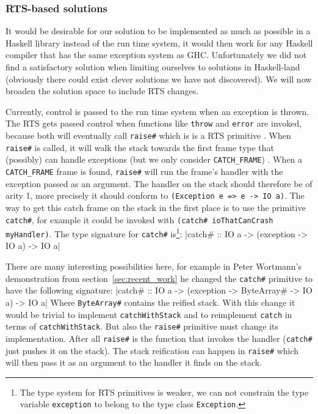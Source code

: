 \subsubsection{RTS-based solutions}

It would be desirable for our solution to be implemented as much
as possible in a Haskell library instead of the run time system, it
would then work for any Haskell compiler that has the same exception system as GHC.
Unfortunately we did not find a satisfactory solution when limiting
ourselves to solutions in Haskell-land (obviously there could exist clever
solutions we have not discovered). We will now broaden the solution
space to include RTS changes.

Currently, control is passed to the run time system when an
exception is thrown. The RTS gets passed control when functions like
\texttt{throw} \cite{hackage_base_control_exception_throw} and \texttt{error}
are invoked, because both will eventually call \texttt{raise\#} which is
is a RTS primitive \cite{github_raisezh}. When \texttt{raise\#} is called, it
will walk the stack towards the first frame type that (possibly) can
handle exceptions (but we only consider \texttt{CATCH\_FRAME})
\cite{github_raisezh_calls_helper, github_raiseExceptionHelter}.
When a \texttt{CATCH\_FRAME} frame is found, \texttt{raise\#} will
run the frame's handler with the exception passed as an argument. The
handler on the stack should therefore be of arity 1, more precisely
it should conform to \texttt{(Exception e => e -> IO a)}. The way to get
this catch frame on the stack in the first place is to use the primitive
\texttt{catch\#}, for example it could be invoked with \texttt{(catch\#
  ioThatCanCrash myHandler)}. The type signature for \texttt{catch\#}
is\footnote{The type system for RTS primitives is weaker, we can not constrain
  the type variable \texttt{exception} to belong to the type class
  \texttt{Exception}.}:
|catch# :: IO a -> (exception -> IO a) -> IO a|

There are many interesting possibilities here, for example in Peter
Wortmann's demonstration from section~\ref{sec:recent_work} he changed the
\texttt{catch\#} primitive to have the following signature:
|catch# :: IO a -> (exception -> ByteArray# -> IO a) -> IO a|
Where \texttt{ByteArray\#} contains the reified stack. With this change
it would be trivial to implement \texttt{catchWithStack} and
to reimplement \texttt{catch} in terms of \texttt{catchWithStack}. But
also the \texttt{raise\#} primitive must change its implementation. After
all \texttt{raise\#} is the function that invokes the handler
(\texttt{catch\#} just pushes it on the stack). The stack reification
can happen in \texttt{raise\#} which will then pass it as an argument to the
handler it finds on the stack.

